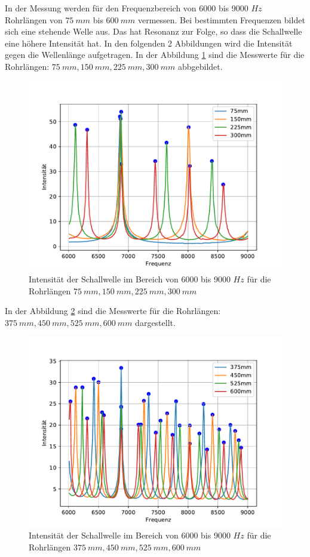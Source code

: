 In der Messung werden für den Frequenzbereich von 6000 bis 9000 $\si{Hz}$ Rohrlängen von $\SI{75}{mm}$ bis $\SI{600}{mm}$ vermessen.
Bei bestimmten Frequenzen bildet sich eine stehende Welle aus. Das hat Resonanz zur Folge, so dass die Schallwelle eine höhere Intensität hat.
In den folgenden 2 Abbildungen wird die Intensität gegen die Wellenlänge aufgetragen.
In der Abbildung \ref{fig.1} sind die Messwerte für die Rohrlängen: $\SI{75}{mm}, \SI{150}{mm}, \SI{225}{mm}, \SI{300}{mm}$ abbgebildet.
\begin{figure}[h!]
  \centering
  \includegraphics[width=\textwidth]{1234.pdf}
  \caption{Intensität der Schallwelle im Bereich von 6000 bis 9000 $\si{Hz}$ für die Rohrlängen $\SI{75}{mm}, \SI{150}{mm}, \SI{225}{mm}, \SI{300}{mm}$}
  \label{fig.1}
\end{figure}
In der Abbildung \ref{fig.2} sind die Messwerte für die Rohrlängen: $\SI{375}{mm}, \SI{450}{mm}, \SI{525}{mm}, \SI{600}{mm}$ dargestellt.
\begin{figure}[h!]
  \centering
  \includegraphics[width=\textwidth]{5678.pdf}
  \caption{Intensität der Schallwelle im Bereich von 6000 bis 9000 $\si{Hz}$ für die Rohrlängen $\SI{375}{mm}, \SI{450}{mm}, \SI{525}{mm}, \SI{600}{mm}$}
  \label{fig.2}
\end{figure}
